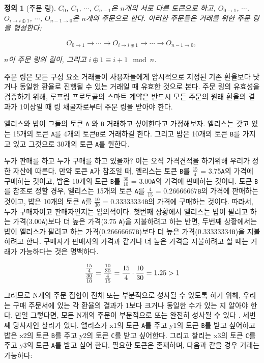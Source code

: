 \documentclass{article}
\newtheorem{definition}{정의}[section]
\begin{document}
\begin{multicols}{2}
\begin{definition}[주문 링] $C_{0}$, $C_{1}$, $\cdots$, $C_{n-1}$은 $n$개의 서로 다른 토큰으로 하고, $O_{0\rightarrow 1}$, $\cdots$, $O_{i\rightarrow i\oplus 1}$, $\cdots$, $O_{n-1 \rightarrow 0}$은 $n$개의 주문으로 한다. 이러한 주문들은 거래를 위한 주문 링을 형성한다:

$$O_{0\rightarrow 1} \rightarrow \cdots \rightarrow O_{i\rightarrow i\oplus 1} \rightarrow \cdots \rightarrow O_{n-1\rightarrow 0} \text{, }$$

$n$이 주문 링의 길이, 그리고 $i\oplus 1 \equiv i+1 \mod n$.

\end{definition}

주문 링은 모든 구성 요소 거래들이 사용자들에게 암시적으로 지정된 기존 환율보다 낫거나 동일한 환율로 진행될 수 있는 거래일 때 유효한 것으로 본다. 주문 링의 유효성을 검증하기 위해, 루프링 프로토콜의 스마트 계약은 반드시 모든 주문의 원래 환율의 결과가 1이상일 때 링 채굴자로부터 주문 링을 받아야 한다.

앨리스와 밥이 그들의 토큰  \verb|A| 와 \verb|B| 거래하고 싶어한다고 가정해보자. 앨리스는 갖고 있는 15개의 토큰  \verb|A|를 4개의 토큰\verb|B|로 거래하길 한다. 그리고 밥은 10개의 토큰 \verb|B|를 가지고 있고 그것으로 30개의 토큰 \verb|A|를 원한다.

누가 판매를 하고 누가 구매를 하고 있을까? 이는 오직 가격견적을 하기위해 우리가 정한 자산에 따른다. 만약 토큰 \verb|A|가 참조일 때, 엘리스는 토큰 \verb|B|를 $\frac{15}{4}$ = 3.75\verb|A|의 가격에 구매하는 것이고, 밥은 10개의 토큰 \verb|B|를 $\frac{30}{10}$ = 3.00\verb|A|의 가격에 판매하는 것이다. 토큰 \verb|B|를 참조로 정할 경우, 엘리스는 15개의 토큰 \verb|A|를 $\frac{4}{15}$ = 0.26666667\verb|B|의 가격에 판매하는 것이고, 밥은 10개의 토큰 \verb|A|를 $\frac{10}{30}$ = 0.33333334\verb|B|의 가격에 구매하는 것이다. 따라서, 누가 구매자이고 판매자인지는 임의적이다. 
첫번째 상황에서 앨리스는 밥이 팔려고 하는 가격(3.00\verb|A|)보다 더 높은 가격(3.75 \verb|A|)을 지불하려고 하는 반면, 두번째 상황에서는 밥이 엘리스가 팔려고 하는 가격(0.26666667\verb|B|)보다 더 높은 가격(0.33333334\verb|B|)을 지불하려고 한다. 구매자가 판매자의 가격과 같거나 더 높은 가격을 지불하려고 할 때는 거래가 가능하다는 것은 명백하다.

\begin{equation}
{{15\over 4} \over {30\over 10}} = {{10\over 30} \over {4\over 15}}={15 \over 4} \cdot {10 \over 30} = 1.25 > 1
\end{equation}

그러므로 N개의 주문 집합이 전체 또는 부분적으로 성사될 수 있도록 하기 위해, 우리는 구매 주문서에 있는 각 환율의 결과가 1보다 크거나 동일한 수가 있는 지 알아야 한다. 만일 그렇다면, 모든 N개의 주문이 부분적으로 또는 완전히 성사될 수 있다 \cite{supersymmetry}.
세번째 당사자인 찰리가 있다. 앨리스가 x1의 토큰 \verb|A|를 주고 y1의 토큰 \verb|B|를 받고 싶어하고 밥은 x2의 토큰 \verb|B|를 주고 y2의 토큰 \verb|C|를 받고 싶어한다. 그리고 찰리는 x3의 토큰 \verb|C|를 주고 y3의 토큰 \verb|A|를 받고 싶어 한다. 필요한 토큰은 존재하며, 다음과 같을 경우 거래는 가능하다:


\end{multicols}
\end{document}
